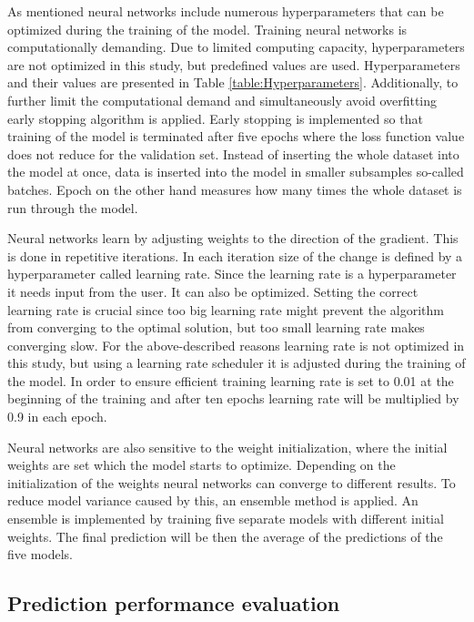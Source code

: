 \documentclass[12pt]{article}
\begin{document}
As mentioned neural networks include numerous hyperparameters that can be optimized during the training of the model. Training neural networks is computationally demanding. Due to limited computing capacity, hyperparameters are not optimized in this study, but predefined values are used. Hyperparameters and their values are presented in Table \ref{table:Hyperparameters}. Additionally, to further limit the computational demand and simultaneously avoid overfitting early stopping algorithm is applied. Early stopping is implemented so that training of the model is terminated after five epochs where the loss function value does not reduce for the validation set. Instead of inserting the whole dataset into the model at once, data is inserted into the model in smaller subsamples so-called batches. Epoch on the other hand measures how many times the whole dataset is run through the model. \par

Neural networks learn by adjusting weights to the direction of the gradient. This is done in repetitive iterations. In each iteration size of the change is defined by a hyperparameter called learning rate. Since the learning rate is a hyperparameter it needs input from the user. It can also be optimized. Setting the correct learning rate is crucial since too big learning rate might prevent the algorithm from converging to the optimal solution, but too small learning rate makes converging slow. For the above-described reasons learning rate is not optimized in this study, but using a learning rate scheduler it is adjusted during the training of the model. In order to ensure efficient training learning rate is set to 0.01 at the beginning of the training and after ten epochs learning rate will be multiplied by 0.9 in each epoch. \par

Neural networks are also sensitive to the weight initialization, where the initial weights are set which the model starts to optimize. Depending on the initialization of the weights neural networks can converge to different results. To reduce model variance caused by this, an ensemble method is applied. An ensemble is implemented by training five separate models with different initial weights. The final prediction will be then the average of the predictions of the five models. \par

\subsection{Prediction performance evaluation}\label{PredictionPerformanceEvaluation}
\end{document}
